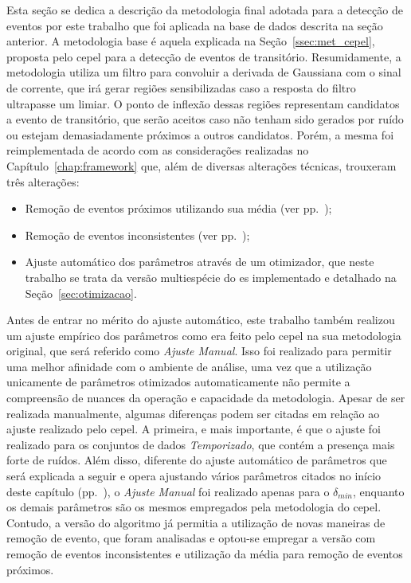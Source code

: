 Esta seção se dedica a descrição da metodologia final adotada para a
detecção de eventos por este trabalho que foi aplicada na base de
dados descrita na seção anterior. A metodologia base é aquela
explicada na Seção~\ref{ssec:met_cepel}, proposta pelo \acs{cepel}
para a detecção de eventos de transitório. Resumidamente, a
metodologia utiliza um filtro para convoluir a derivada de Gaussiana
com o sinal de corrente, que irá gerar regiões sensibilizadas caso a
resposta do filtro ultrapasse um limiar. O ponto de inflexão dessas
regiões representam candidatos a evento de transitório, que serão
aceitos caso não tenham sido gerados por ruído ou estejam
demasiadamente próximos a outros candidatos. Porém, a mesma foi
reimplementada de acordo com as considerações realizadas no
Capítulo~\ref{chap:framework} que, além de diversas alterações
técnicas, trouxeram três alterações:

\begin{itemize}
\item Remoção de eventos próximos utilizando sua média (ver
pp.~\pageref{text:media});
\item Remoção de eventos inconsistentes (ver
pp.~\pageref{text:incosistentes});
\item Ajuste automático dos parâmetros através de um otimizador, que
neste trabalho se trata da versão multiespécie do \acs{es}
implementado e detalhado na Seção~\ref{sec:otimizacao}.
\end{itemize}

Antes de entrar no mérito do ajuste automático, este trabalho também
realizou um ajuste empírico dos parâmetros como era feito pelo
\acs{cepel} na sua metodologia original, que será referido como
\emph{Ajuste Manual}. Isso foi realizado para permitir uma melhor
afinidade com o ambiente de análise, uma vez que a utilização
unicamente de parâmetros otimizados automaticamente não permite a
compreensão de nuances da operação e capacidade da metodologia. Apesar
de ser realizada manualmente, algumas diferenças podem ser citadas em
relação ao ajuste realizado pelo \acs{cepel}. A primeira, e mais
importante, é que o ajuste foi realizado para os conjuntos de dados
\emph{Temporizado}, que contém a presença mais forte de ruídos.  Além
disso, diferente do ajuste automático de parâmetros que será explicada
a seguir e opera ajustando vários parâmetros citados no início deste
capítulo (pp.~\pageref{item:parametros}), o \emph{Ajuste Manual} foi
realizado apenas para o $\delta_{min}$, enquanto os demais parâmetros
são os mesmos empregados pela metodologia do \acs{cepel}. Contudo, a
versão do algoritmo já permitia a utilização de novas maneiras de
remoção de evento, que foram analisadas e optou-se empregar a versão
com remoção de eventos inconsistentes e utilização da média para
remoção de eventos próximos.

